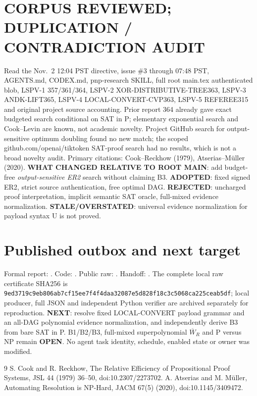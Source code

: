 \documentclass[11pt]{article}
\begin{document}
\section*{CORPUS REVIEWED; DUPLICATION / CONTRADICTION AUDIT}
Read the Nov.\ 2 12:04 PST directive, issue \#3 through 07:48 PST, AGENTS.md, CODEX.md, pnp-research SKILL, full root main.tex authenticated blob, LSPV-1 357/361/364, LSPV-2 XOR-DISTRIBUTIVE-TREE363, LSPV-3 ANDK-LIFT365, LSPV-4 LOCAL-CONVERT-CVP363, LSPV-5 REFEREE315 and original project source accounting. Prior report 364 already gave exact budgeted search conditional on SAT in P; elementary exponential search and Cook--Levin are known, not academic novelty. Project GitHub search for output-sensitive optimum doubling found no new match; the scoped github.com/openai/tiktoken SAT-proof search had no results, which is not a broad novelty audit. Primary citations: Cook--Reckhow (1979), Atserias--M\"uller (2020). \textbf{WHAT CHANGED RELATIVE TO ROOT MAIN}: add budget-free \emph{output-sensitive ER2} search without claiming B3. \textbf{ADOPTED}: fixed signed ER2, strict source authentication, free optimal DAG. \textbf{REJECTED}: uncharged proof interpretation, implicit semantic SAT oracle, full-mixed evidence normalization. \textbf{STALE/OVERSTATED}: universal evidence normalization for payload syntax U is not proved.

\section*{Published outbox and next target}
Formal report: .
Code: .
Public raw: .
Handoff: .
The complete local raw certificate SHA256 is \texttt{9ed3719c9eb806ab7cf15ee7f4f4daa32087e5d828f18c3c5068ca225ceab5df}; local producer, full JSON and independent Python verifier are archived separately for reproduction. \textbf{NEXT}: resolve fixed LOCAL-CONVERT payload grammar and an all-DAG polynomial evidence normalization, and independently derive B3 from bare SAT in P. B1/B2/B3, full-mixed superpolynomial $\overline W_R$ and P versus NP remain \textbf{OPEN}. No agent task identity, schedule, enabled state or owner was modified.

\begin{thebibliography}{9}
 S. Cook and R. Reckhow, The Relative Efficiency of Propositional Proof Systems, JSL 44 (1979) 36--50, doi:10.2307/2273702.
 A. Atserias and M. M\"uller, Automating Resolution is NP-Hard, JACM 67(5) (2020), doi:10.1145/3409472.
\end{thebibliography}
\end{document}
